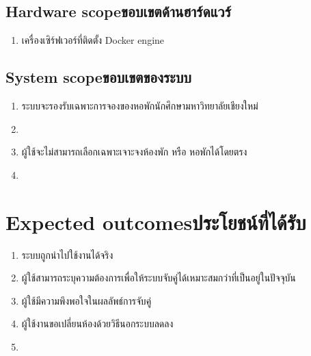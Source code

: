 \subsection{\ifenglish Hardware scope\else ขอบเขตด้านฮาร์ดแวร์\fi}
\begin{enumerate}
    \item เครื่องเซิร์ฟเวอร์ที่ติดตั้ง Docker engine
\end{enumerate}
\subsection{\ifenglish System scope\else ขอบเขตของระบบ\fi}
\begin{enumerate}
    \item ระบบจะรองรับเฉพาะการจองของหอพักนักศึกษามหาวิทยาลัยเชียงใหม่
    \item {}
    \item ผู้ใช้จะไม่สามารถเลือกเฉพาะเจาะจงห้องพัก หรือ หอพักได้โดยตรง
    \item {}
\end{enumerate}

\section{\ifenglish Expected outcomes\else ประโยชน์ที่ได้รับ\fi}
\begin{enumerate}
    \item ระบบถูกนำไปใช้งานได้จริง
    \item ผู้ใช้สามารถระบุความต้องการเพื่อให้ระบบจับคู่ได้เหมาะสมกว่าที่เป็นอยู่ในปัจจุบัน
    \item ผู้ใช้มีความพึงพอใจในผลลัพธ์การจับคู่
    \item ผู้ใช้งานขอเปลี่ยนห้องด้วยวิธีนอกระบบลดลง
    \item {}
\end{enumerate}

